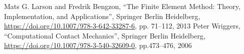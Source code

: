\documentclass[paper=a4]{jlreq}
\begin{document}
\begin{thebibliography}{9}
     Mats G. Larson and Fredrik Bengzon, ``The Finite Element Method: Theory,  Implementation,  and Applications'', Springer Berlin Heidelberg, \url{https://doi.org/10.1007/978-3-642-33287-6}, pp. 71--112, 2013
     Peter Wriggers, ``Computational Contact Mechanics'', Springer Berlin Heidelberg, \url{https://doi.org/10.1007/978-3-540-32609-0}, pp.473--476, 2006 
\end{thebibliography}
\end{document}
